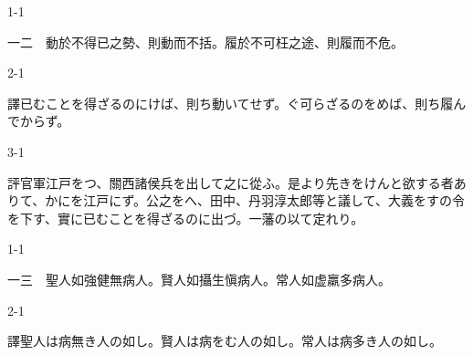 \documentclass[tate,paper=b6j,jafontsize=9pt]{jlreq}
\begin{document}
\begin{azconvIndented}{1\zw}{-1\zw}

一二　動於不得已之勢、則動而不括。履於不可枉之途、則履而不危。

\end{azconvIndented}
\begin{azconvIndented}{2\zw}{-1\zw}

譯已むことを得ざるのにけば、則ち動いてせず。ぐ可らざるのをめば、則ち履んでからず。

\end{azconvIndented}
\begin{azconvIndented}{3\zw}{-1\zw}

評官軍江戸をつ、關西諸侯兵を出して之に從ふ。是より先きをけんと欲する者ありて、かにを江戸にず。公之をへ、田中、丹羽淳太郎等と議して、大義をすの令を下す、實に已むことを得ざるのに出づ。一藩の以て定れり。

\end{azconvIndented}

\begin{azconvIndented}{1\zw}{-1\zw}

一三　聖人如強健無病人。賢人如攝生愼病人。常人如虚羸多病人。

\end{azconvIndented}
\begin{azconvIndented}{2\zw}{-1\zw}

譯聖人は病無き人の如し。賢人は病をむ人の如し。常人は病多き人の如し。

\end{azconvIndented}
\end{document}
